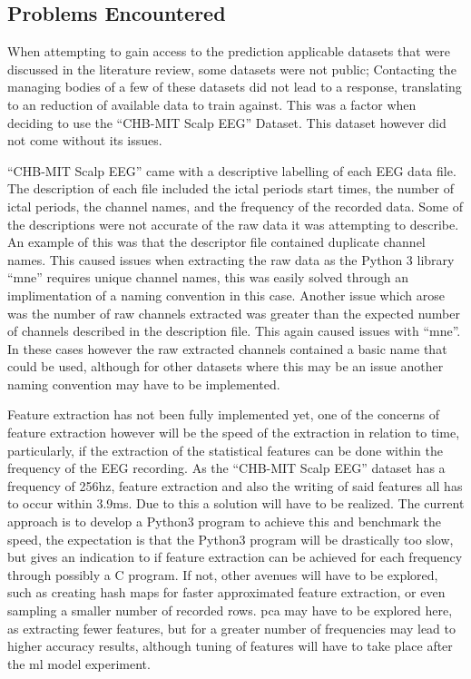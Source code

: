 \documentclass[12pt]{article}
\begin{document}
\subsection{Problems Encountered}

When attempting to gain access to the prediction applicable datasets that were discussed in the literature review, some datasets were not public; Contacting the managing bodies of a few of these datasets did not lead to a response, translating to an reduction of available data to train against. This was a factor when deciding to use the ``CHB-MIT Scalp EEG'' Dataset. This dataset however did not come without its issues.

``CHB-MIT Scalp EEG'' came with a descriptive labelling of each EEG data file. The description of each file included the ictal periods start times, the number of ictal periods, the channel names, and the frequency of the recorded data. Some of the descriptions were not accurate of the raw data it was attempting to describe. An example of this was that the descriptor file contained duplicate channel names. This caused issues when extracting the raw data as the Python 3 library ``mne'' requires unique channel names,  this was easily solved through an implimentation of a naming convention in this case. Another issue which arose was the number of raw channels extracted was greater than the expected number of channels described in the description file. This again caused issues with ``mne''. In these cases however the raw extracted channels contained a basic name that could be used, although for other datasets where this may be an issue another naming convention may have to be implemented. 

Feature extraction has not been fully implemented yet, one of the concerns of feature extraction however will be the speed of the extraction in relation to time, particularly, if the extraction of the statistical features can be done within the frequency of the EEG recording. As the ``CHB-MIT Scalp EEG'' dataset has a frequency of 256hz, feature extraction and also the writing of said features all has to occur within 3.9ms. Due to this a solution will have to be realized. The current approach is to develop a Python3 program to achieve this and benchmark the speed, the expectation is that the Python3 program will be drastically too slow, but gives an indication to if feature extraction can be achieved for each frequency through possibly a C program. If not, other avenues will have to be explored, such as creating hash maps for faster approximated feature extraction, or even sampling a smaller number of recorded rows. \acrfull{pca} may have to be explored here, as extracting fewer features, but for a greater number of frequencies may lead to higher accuracy results, although tuning of features will have to take place after the \acrshort{ml} model experiment.
\end{document}
